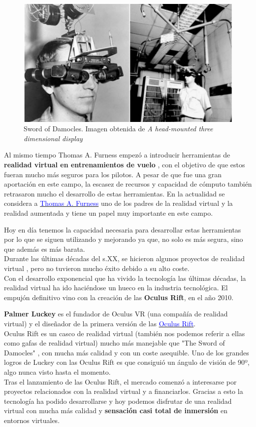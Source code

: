\documentclass[twoside, 11pt]{epstfg}
\begin{document}
\begin{figure}[H]
	\centerline{
		\mbox{\includegraphics[width=.80\textwidth]{images/SwordOfDamocles.jpg}}
	}
	\caption{Sword of Damocles. Imagen obtenida de \textit{A head-mounted three dimensional display} \cite{Sutherland}}
	\label{fig::SwordOfDamocles}
\end{figure}


Al mismo tiempo Thomas A. Furness empezó a introducir herramientas de \textbf{realidad virtual en entrenamientos de vuelo} \cite{kocian1977visually}, con el objetivo de que estos fueran mucho más seguros para los pilotos.
A pesar de que fue una gran aportación en este campo, la escasez de recursos y capacidad de cómputo también retrasaron mucho el desarrollo de estas herramientas. En la actualidad se considera a \href{https://www.youtube.com/watch?v=zr89F88AuUI}{\textcolor{blue}{Thomas A. Furness}} uno de los padres de la realidad virtual y la realidad aumentada y tiene un papel muy importante en este campo. 
 
Hoy en día tenemos la capacidad necesaria para desarrollar estas herramientas por lo que se siguen utilizando y mejorando ya que, no solo es más segura, sino que además es más barata.\\
Durante las últimas décadas del s.XX, se hicieron algunos proyectos de realidad virtual , pero no tuvieron mucho éxito debido a su alto coste.\\
Con el desarrollo exponencial que ha vivido la tecnología las últimas décadas, la realidad virtual ha ido haciéndose un hueco en la industria tecnológica.
El empujón definitivo vino con la creación de las \textbf{Oculus Rift}, en el año 2010.

\textbf{Palmer Luckey} es el fundador de Oculus VR (una compañía de realidad virtual) y el diseñador de la primera versión de las \href{https://www.oculus.com/}{\textcolor{blue}{Oculus Rift}}.\\
Oculus Rift es un casco de realidad virtual (también nos podemos referir a ellas como gafas de realidad virtual) mucho más manejable que "The Sword of Damocles" , con mucha más calidad y con un coste asequible.
Uno de los grandes logros de Luckey con las Oculus Rift es que consiguió un ángulo de visión de 90º, algo nunca visto hasta el momento.\\
Tras el lanzamiento de las Oculus Rift, el mercado comenzó a interesarse por proyectos relacionados con la realidad virtual y a financiarlos.
Gracias a esto la tecnología ha podido desarrollarse y hoy podemos disfrutar de una realidad virtual con mucha más calidad y \textbf{sensación casi total de inmersión} en entornos virtuales.
\end{document}
